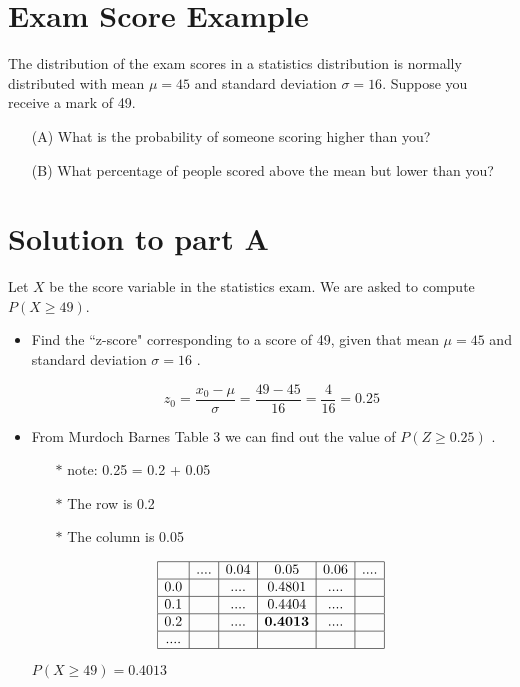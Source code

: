 \documentclass[a4paper,12pt]{article}
\begin{document}
	\section*{Exam Score Example}
	The distribution of the exam scores in a statistics distribution is normally distributed with mean $\mu=45$  and standard deviation 
	$\sigma=16$. Suppose you receive a mark of 49.
	\begin{itemize}
		\item[(A)]
		What is the probability of someone scoring higher than you?
		
		\item[(B)] What percentage of people scored above the mean but lower than you?
	\end{itemize}
		\section*{Solution to part A}
	
	Let $X$ be the score variable in the statistics exam. We are asked to compute $P(X \geq 49)$.
\begin{itemize}	
\item Find the  ``z-score" corresponding to a score of 49, given that mean $\mu=45$ and standard deviation  $\sigma=16$ .
	
	\[ z_0  = \frac{x_0-\mu}{\sigma}   = \frac{49-45}{16}  = \frac{4}{16} =0.25\]
	
\item From Murdoch Barnes Table 3 we can find out the value of $P(Z \geq 0.25)$  . 
	
	
	
	\begin{itemize}
	\item[$\ast$] note: 0.25 = 0.2 + 0.05
	\item[$\ast$] The row is 0.2
	\item[$\ast$] The column is 0.05
	\end{itemize}
	\[
	\begin{array}{|c|c|c|c|c|c|c|}\hline
	& ....	& 0.04	& 0.05	 & 0.06	& .... \\ \hline
	0.0	&	& ....	& 0.4801 & ....	& 	\\ \hline
	0.1	&	& ....	& 0.4404 & ....& 	\\ \hline
	0.2	&	& ....	& \textbf{0.4013} & ....	& 	\\ \hline
	....	&	&	&	 & 	&	\\ \hline
	
	\end{array} \]
	
$P(X \geq 49)  = 0.4013$
\end{itemize}
	
\end{document}
